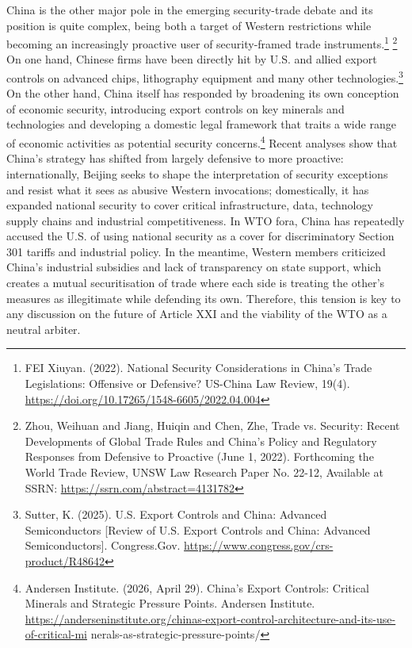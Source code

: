 China is the other major pole in the emerging security-trade debate and its position is quite complex, being both a target of Western restrictions while becoming an increasingly proactive user of security-framed trade instruments.\footnote{FEI Xiuyan. (2022). National Security Considerations in China’s Trade Legislations: Offensive or Defensive? US-China Law Review, 19(4). \url{https://doi.org/10.17265/1548-6605/2022.04.004}} \footnote{Zhou, Weihuan and Jiang, Huiqin and Chen, Zhe, Trade vs. Security: Recent Developments of Global Trade Rules and China's Policy and Regulatory Responses from Defensive to Proactive (June 1, 2022). Forthcoming the World Trade Review, UNSW Law Research Paper No. 22-12, Available at SSRN: \url{https://ssrn.com/abstract=4131782}} On one hand, Chinese firms have been directly hit by U.S. and allied export controls on advanced chips, lithography equipment and many other technologies.\footnote{Sutter, K. (2025). U.S. Export Controls and China: Advanced Semiconductors [Review of U.S. Export Controls and China: Advanced Semiconductors]. Congress.Gov. \url{https://www.congress.gov/crs-product/R48642}} On the other hand, China itself has responded by broadening its own conception of economic security, introducing export controls on key minerals and technologies and developing a domestic legal framework that traits a wide range of economic activities as potential security concerns.\footnote{Andersen Institute. (2026, April 29). China’s Export Controls: Critical Minerals and Strategic Pressure Points. Andersen Institute. \url{https://anderseninstitute.org/chinas-export-control-architecture-and-its-use-of-critical-mi} nerals-as-strategic-pressure-points/} Recent analyses show that China’s strategy has shifted from largely defensive to more proactive: internationally, Beijing seeks to shape the interpretation of security exceptions and resist what it sees as abusive Western invocations; domestically, it has expanded national security to cover critical infrastructure, data, technology supply chains and industrial competitiveness. In WTO fora, China has repeatedly accused the U.S. of using national security as a cover for discriminatory Section 301 tariffs and industrial policy. In the meantime, Western members criticized China’s industrial subsidies and lack of transparency on state support, which creates a mutual securitisation of trade where each side is treating the other’s measures as illegitimate while defending its own. Therefore, this tension is key to any discussion on the future of Article XXI and the viability of the WTO as a neutral arbiter.

